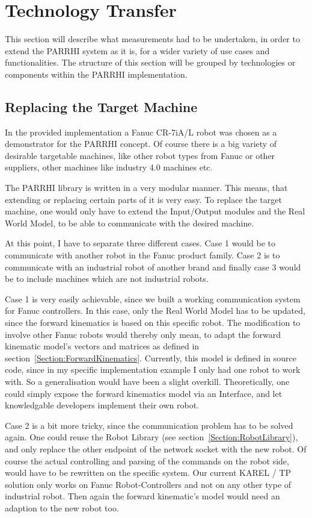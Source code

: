 \section{Technology Transfer}\label{Section:TechnologyTransfer}

This section will describe what measurements had to be undertaken, in order to extend the PARRHI system as it is, for a wider variety of use cases and functionalities. The structure of this section will be grouped by technologies or components within the PARRHI implementation.

\subsection{Replacing the Target Machine}
In the provided implementation a Fanuc CR-7iA/L robot was chosen as a demonstrator for the PARRHI concept. Of course there is a big variety of desirable targetable machines, like other robot types from Fanuc or other suppliers, other machines like industry 4.0 machines etc.

The PARRHI library is written in a very modular manner. This means, that extending or replacing certain parts of it is very easy. To replace the target machine, one would only have to extend the Input/Output modules and the Real World Model, to be able to communicate with the desired machine.

At this point, I have to separate three different cases. Case 1 would be to communicate with another robot in the Fanuc product family. Case 2 is to communicate with an industrial robot of another brand and finally case 3 would be to include machines which are not industrial robots. 

Case 1 is very easily achievable, since we built a working communication system for Fanuc controllers. In this case, only the Real World Model has to be updated, since the forward kinematics is based on this specific robot. The modification to involve other Fanuc robots would thereby only mean, to adapt the forward kinematic model's vectors and matrices as defined in section~\ref{Section:ForwardKinematics}. Currently, this model is defined in source code, since in my specific implementation example I only had one robot to work with. So a generalisation would have been a slight overkill. Theoretically, one could simply expose the forward kinematics model via an Interface, and let knowledgable developers implement their own robot. 

Case 2 is a bit more tricky, since the communication problem has to be solved again. One could reuse the Robot Library (see section~\ref{Section:RobotLibrary}), and only replace the other endpoint of the network socket with the new robot. Of course the actual controlling and parsing of the commands on the robot side, would have to be rewritten on the specific system. Our current KAREL / TP solution only works on Fanuc Robot-Controllers and not on any other type of industrial robot. Then again the forward kinematic's model would need an adaption to the new robot too.

